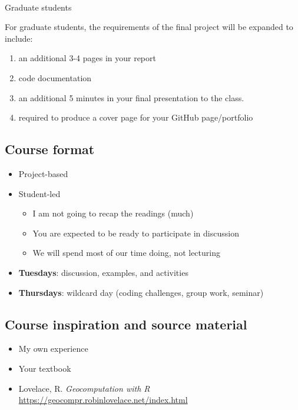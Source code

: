\documentclass[
  letterpaper,
  DIV=11,
  numbers=noendperiod]{scrartcl}
\makeatletter
\let\oldparagraph\paragraph
\renewcommand{\paragraph}{
    \@ifstar
      \xxxParagraphStar
      \xxxParagraphNoStar
  }
\newcommand{\xxxParagraphStar}[1]{\oldparagraph*{#1}\mbox{}}
\newcommand{\xxxParagraphNoStar}[1]{\oldparagraph{#1}\mbox{}}
\providecommand{\tightlist}{%
  \setlength{\itemsep}{0pt}\setlength{\parskip}{0pt}}
\makeatother
\begin{document}
\paragraph{Graduate students}\label{graduate-students}

For graduate students, the requirements of the final project will be
expanded to include:

\begin{enumerate}
\def\labelenumi{\arabic{enumi})}
\tightlist
\item
  an additional 3-4 pages in your report
\item
  code documentation
\item
  an additional 5 minutes in your final presentation to the class.
\item
  required to produce a cover page for your GitHub page/portfolio
\end{enumerate}

\subsection{Course format}\label{course-format}

\begin{itemize}
\tightlist
\item
  Project-based
\item
  Student-led

  \begin{itemize}
  \tightlist
  \item
    I am not going to recap the readings (much)
  \item
    You are expected to be ready to participate in discussion
  \item
    We will spend most of our time doing, not lecturing
  \end{itemize}
\item
  \textbf{Tuesdays}: discussion, examples, and activities
\item
  \textbf{Thursdays}: wildcard day (coding challenges, group work,
  seminar)
\end{itemize}

\subsection{Course inspiration and source
material}\label{course-inspiration-and-source-material}

\begin{itemize}
\tightlist
\item
  My own experience
\item
  Your textbook
\item
  Lovelace, R. \emph{Geocomputation with R}
  \url{https://geocompr.robinlovelace.net/index.html}
\end{itemize}
\end{document}
